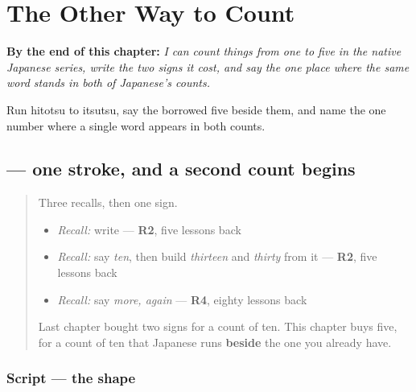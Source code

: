 
\chapter{The Other Way to Count}
\label{ch:ja-native-count-one-to-five}

\begin{chapteropening}
\textbf{By the end of this chapter:} \emph{I can count things from one to five in the native Japanese series, write the two signs it cost, and say the one place where the same word stands in both of Japanese's counts.}

Run hitotsu to itsutsu, say the borrowed five beside them, and name the one number where a single word appears in both counts.
\end{chapteropening}

\section[\texorpdfstring{\ja{ひ} (hi)}{ひ (hi)}]{ — one stroke, and a second count begins}

\label{lesson:JA-W16-hi}



\begin{quote}
Three recalls, then one sign.

\begin{itemize}
\raggedright
  \item \emph{Recall:} write \textbf{} — \textbf{R2}, five lessons back
  \item \emph{Recall:} say \emph{ten}, then build \emph{thirteen} and \emph{thirty} from it — \textbf{R2}, five lessons back
  \item \emph{Recall:} say \emph{more, again} — \textbf{R4}, eighty lessons back
\end{itemize}

Last chapter bought two signs for a count of ten. This chapter buys five, for a count of ten that Japanese runs \textbf{beside} the one you already have.
\end{quote}

\subsection*{Script — the shape}

